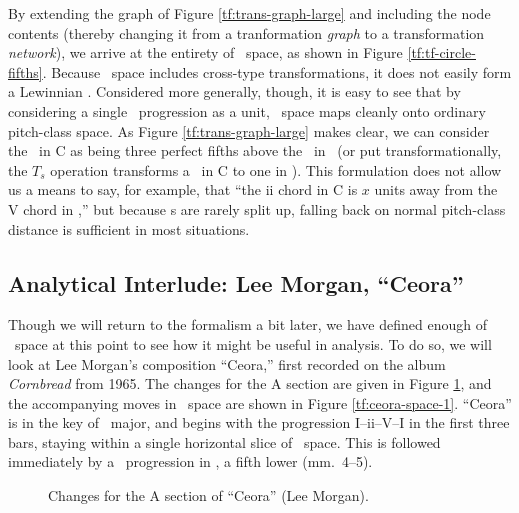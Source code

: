 By extending the graph of Figure \ref{tf:trans-graph-large} and including the
node contents (thereby changing it from a tranformation \emph{graph} to a
transformation \emph{network}), we arrive at the entirety of \tf\ space, as
shown in Figure \ref{tf:tf-circle-fifths}. Because \tf\ space includes
cross-type transformations, it does not easily form a Lewinnian \gis.
Considered more generally, though, it is easy to see that by considering a
single \tfo\ progression as a unit, \tf\ space maps cleanly onto ordinary
pitch-class space.  As Figure \ref{tf:trans-graph-large} makes clear, we can
consider the \tfo\ in C as being three perfect fifths above the \tfo\ in
\Eflat\ (or put transformationally, the $T_s$ operation transforms a \tfo\ in
C to one in \Eflat). This formulation does not allow us a means to say, for
example, that “the ii chord in C is $x$ units away from the V chord in
\Eflat,” but because \tfo{}s are rarely split up, falling back on normal
pitch-class distance is sufficient in most situations.




\FloatBarrier

\subsection{Analytical Interlude: Lee Morgan, “Ceora”}
\label{sec:ceora-analysis}


Though we will return to the formalism a bit later, we have defined enough of
\tf\ space at this point to see how it might be useful in analysis. To do so,
we will look at Lee Morgan's composition ``Ceora,'' first recorded on the
album \emph{Cornbread} from 1965. The changes for the A section are given in
Figure \ref{tf:ceora-changes-1}, and the accompanying moves in \tf\ space are
shown in Figure \ref{tf:ceora-space-1}. ``Ceora'' is in the key of
\Aflat\ major, and begins with the progression I--ii--V--I in the first three
bars, staying within a single horizontal slice of \tf\ space. This is followed
immediately by a \tfo\ progression in \Dflat, a fifth lower (mm.~4--5).

\begin{figure}[thbp]
  \caption{Changes for the A section of ``Ceora'' (Lee Morgan).}
  \label{tf:ceora-changes-1}
\end{figure}

